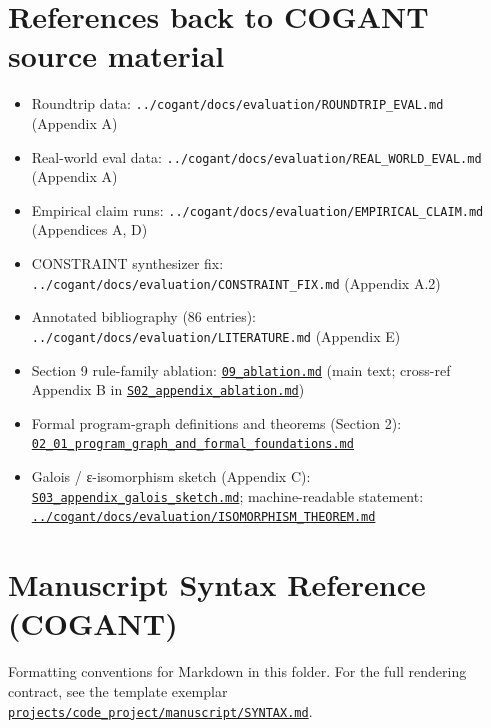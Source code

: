 \documentclass[
]{article}
\providecommand{\tightlist}{%
  \setlength{\itemsep}{0pt}\setlength{\parskip}{0pt}}
\begin{document}
\newpage

\section{References back to COGANT source
material}\label{references-back-to-cogant-source-material}

\begin{itemize}
\tightlist
\item
  Roundtrip data: \texttt{../cogant/docs/evaluation/ROUNDTRIP\_EVAL.md}
  (Appendix A)
\item
  Real-world eval data:
  \texttt{../cogant/docs/evaluation/REAL\_WORLD\_EVAL.md} (Appendix A)
\item
  Empirical claim runs:
  \texttt{../cogant/docs/evaluation/EMPIRICAL\_CLAIM.md} (Appendices A,
  D)
\item
  CONSTRAINT synthesizer fix:
  \texttt{../cogant/docs/evaluation/CONSTRAINT\_FIX.md} (Appendix A.2)
\item
  Annotated bibliography (86 entries):
  \texttt{../cogant/docs/evaluation/LITERATURE.md} (Appendix E)
\item
  Section 9 rule-family ablation:
  \href{09_ablation.md}{\texttt{09\_ablation.md}} (main text; cross-ref
  Appendix B in
  \href{S02_appendix_ablation.md}{\texttt{S02\_appendix\_ablation.md}})
\item
  Formal program-graph definitions and theorems (Section 2):
  \href{02_01_program_graph_and_formal_foundations.md}{\texttt{02\_01\_program\_graph\_and\_formal\_foundations.md}}
\item
  Galois / ε-isomorphism sketch (Appendix C):
  \href{S03_appendix_galois_sketch.md}{\texttt{S03\_appendix\_galois\_sketch.md}};
  machine-readable statement:
  \href{../cogant/docs/evaluation/ISOMORPHISM_THEOREM.md}{\texttt{../cogant/docs/evaluation/ISOMORPHISM\_THEOREM.md}}
\end{itemize}

\newpage

\section{Manuscript Syntax Reference
(COGANT)}\label{manuscript-syntax-reference-cogant}

Formatting conventions for Markdown in this folder. For the full
rendering contract, see the template exemplar
\href{../../../projects/code_project/manuscript/SYNTAX.md}{\texttt{projects/code\_project/manuscript/SYNTAX.md}}.
\end{document}
